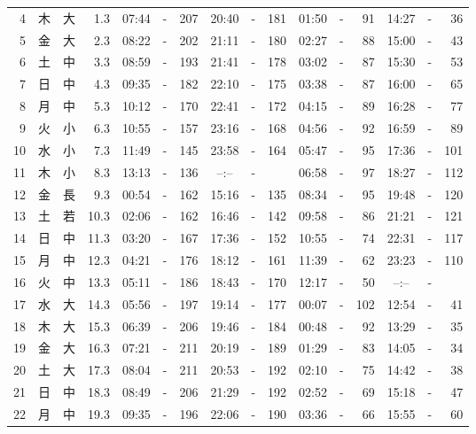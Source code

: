 \documentclass[12pt.a4j]{jsarticle}
\begin{document}
\begin{center}
\begin{table}[ht]
\begin{tabular}{|rc|cr|ccrccr|ccrccr|}
 4 & 木 & 大 &  1.3 &  07:44 &-& 207  &  20:40 &-& 181  &   01:50 &-&  91  &   14:27 &-&  36  \\
 5 & 金 & 大 &  2.3 &  08:22 &-& 202  &  21:11 &-& 180  &   02:27 &-&  88  &   15:00 &-&  43  \\
 6 & 土 & 中 &  3.3 &  08:59 &-& 193  &  21:41 &-& 178  &   03:02 &-&  87  &   15:30 &-&  53  \\
 7 & 日 & 中 &  4.3 &  09:35 &-& 182  &  22:10 &-& 175  &   03:38 &-&  87  &   16:00 &-&  65  \\
 8 & 月 & 中 &  5.3 &  10:12 &-& 170  &  22:41 &-& 172  &   04:15 &-&  89  &   16:28 &-&  77  \\
 9 & 火 & 小 &  6.3 &  10:55 &-& 157  &  23:16 &-& 168  &   04:56 &-&  92  &   16:59 &-&  89  \\
10 & 水 & 小 &  7.3 &  11:49 &-& 145  &  23:58 &-& 164  &   05:47 &-&  95  &   17:36 &-& 101  \\
11 & 木 & 小 &  8.3 &  13:13 &-& 136  &  --:-- &-&     &   06:58 &-&  97  &   18:27 &-& 112  \\
12 & 金 & 長 &  9.3 &  00:54 &-& 162  &  15:16 &-& 135  &   08:34 &-&  95  &   19:48 &-& 120  \\
13 & 土 & 若 & 10.3 &  02:06 &-& 162  &  16:46 &-& 142  &   09:58 &-&  86  &   21:21 &-& 121  \\
14 & 日 & 中 & 11.3 &  03:20 &-& 167  &  17:36 &-& 152  &   10:55 &-&  74  &   22:31 &-& 117  \\
15 & 月 & 中 & 12.3 &  04:21 &-& 176  &  18:12 &-& 161  &   11:39 &-&  62  &   23:23 &-& 110  \\
16 & 火 & 中 & 13.3 &  05:11 &-& 186  &  18:43 &-& 170  &   12:17 &-&  50  &   --:-- &-&     \\
17 & 水 & 大 & 14.3 &  05:56 &-& 197  &  19:14 &-& 177  &   00:07 &-& 102  &   12:54 &-&  41  \\
18 & 木 & 大 & 15.3 &  06:39 &-& 206  &  19:46 &-& 184  &   00:48 &-&  92  &   13:29 &-&  35  \\
19 & 金 & 大 & 16.3 &  07:21 &-& 211  &  20:19 &-& 189  &   01:29 &-&  83  &   14:05 &-&  34  \\
20 & 土 & 大 & 17.3 &  08:04 &-& 211  &  20:53 &-& 192  &   02:10 &-&  75  &   14:42 &-&  38  \\
21 & 日 & 中 & 18.3 &  08:49 &-& 206  &  21:29 &-& 192  &   02:52 &-&  69  &   15:18 &-&  47  \\
22 & 月 & 中 & 19.3 &  09:35 &-& 196  &  22:06 &-& 190  &   03:36 &-&  66  &   15:55 &-&  60  \\

\end{tabular}
\end{table}
\end{center}
\end{document}
